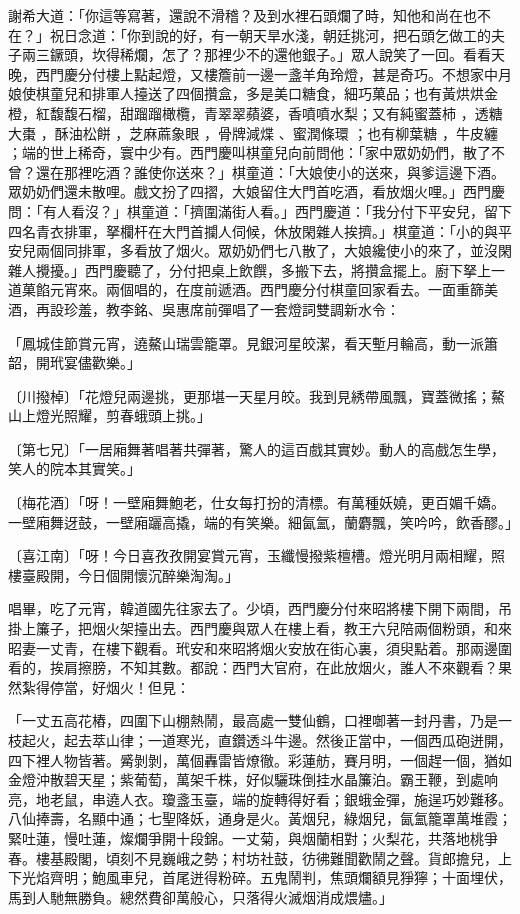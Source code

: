 \begin{showcontents}{}
謝希大道：「你這等寫著，還說不滑稽？及到水裡石頭爛了時，知他和尚在也不在？」祝日念道：「你到說的好，有一朝天旱水淺，朝廷挑河，把石頭乞做工的夫子兩三鐝頭，坎得稀爛，怎了？那裡少不的還他銀子。」眾人說笑了一回。看看天晚，西門慶分付樓上點起燈，又樓簷前一邊一盞羊角玲燈，甚是奇巧。不想家中月娘使棋童兒和排軍人擡送了四個攢盒，多是美口糖食，細巧菓品；也有黃烘烘金橙，紅馥馥石榴，甜蹓蹓橄欖，青翠翠蘋婆，香噴噴水梨；又有純蜜蓋柿 ，透糖大棗 ，酥油松餅 ，芝麻蔴象眼 ，骨牌減煠 、蜜潤條環 ；也有柳葉糖 ，牛皮纏 ；端的世上稀奇，寰中少有。西門慶叫棋童兒向前問他：「家中眾奶奶們，散了不曾？還在那裡吃酒？誰使你送來？」棋童道：「大娘使小的送來，與爹這邊下酒。眾奶奶們還未散哩。戲文扮了四摺，大娘留住大門首吃酒，看放烟火哩。」西門慶問：「有人看沒？」棋童道：「擠圍滿街人看。」西門慶道：「我分付下平安兒，留下四名青衣排軍，拏欄杆在大門首攔人伺候，休放閑雜人挨擠。」棋童道：「小的與平安兒兩個同排軍，多看放了烟火。眾奶奶們七八散了，大娘纔使小的來了，並沒閑雜人攪擾。」西門慶聽了，分付把桌上飲饌，多搬下去，將攢盒擺上。廚下拏上一道菓餡元宵來。兩個唱的，在度前遞酒。西門慶分付棋童回家看去。一面重篩美酒，再設珍羞，教李銘、吳惠席前彈唱了一套燈詞雙調新水令：

「鳳城佳節賞元宵，遶鰲山瑞雲籠罩。見銀河星皎潔，看天塹月輪高，動一派簫韶，開玳宴儘歡樂。」

〔川撥棹〕「花燈兒兩邊挑，更那堪一天星月皎。我到見綉帶風飄，寶蓋微搖；鰲山上燈光照耀，剪春蛾頭上挑。」

〔第七兄〕「一居廂舞著唱著共彈著，驚人的這百戲其實妙。動人的高戲怎生學，笑人的院本其實笑。」

〔梅花酒〕「呀！一壁廂舞鮑老，仕女每打扮的清標。有萬種妖嬈，更百媚千嬌。一壁廂舞迓鼓，一壁廂躧高撬，端的有笑樂。細氤氳，蘭麝飄，笑吟吟，飲香醪。」

〔喜江南〕「呀！今日喜孜孜開宴賞元宵，玉纖慢撥紫檀槽。燈光明月兩相耀，照樓臺殿開，今日個開懷沉醉樂淘淘。」

唱畢，吃了元宵，韓道國先往家去了。少頃，西門慶分付來昭將樓下開下兩間，吊掛上簾子，把烟火架擡出去。西門慶與眾人在樓上看，教王六兒陪兩個粉頭，和來昭妻一丈青，在樓下觀看。玳安和來昭將烟火安放在街心裏，須臾點着。那兩邊圍看的，挨肩擦膀，不知其數。都說：西門大官府，在此放烟火，誰人不來觀看？果然紮得停當，好烟火！但見：

「一丈五高花樁，四圍下山棚熱鬧，最高處一雙仙鶴，口裡啣著一封丹書，乃是一枝起火，起去萃山律；一道寒光，直鑽透斗牛邊。然後正當中，一個西瓜砲迸開，四下裡人物皆著。觱剝剝，萬個轟雷皆燎徹。彩蓮舫，賽月明，一個趕一個，猶如金燈沖散碧天星；紫葡萄，萬架千株，好似驪珠倒挂水晶簾泊。霸王鞭，到處响亮，地老鼠，串遶人衣。瓊盞玉臺，端的旋轉得好看；銀蛾金彈，施逞巧妙難移。八仙捧壽，名顯中通；七聖降妖，通身是火。黃烟兒，綠烟兒，氤氳籠罩萬堆霞；緊吐蓮，慢吐蓮，燦爛爭開十段錦。一丈菊，與烟蘭相對；火梨花，共落地桃爭春。樓基殿閣，頃刻不見巍峨之勢；村坊社鼓，彷彿難聞歡鬧之聲。貨郎擔兒，上下光焰齊明；鮑風車兒，首尾迸得粉碎。五鬼鬧判，焦頭爛額見猙獰；十面埋伏，馬到人馳無勝負。總然費卻萬般心，只落得火滅烟消成煨燼。」


\end{showcontents}
